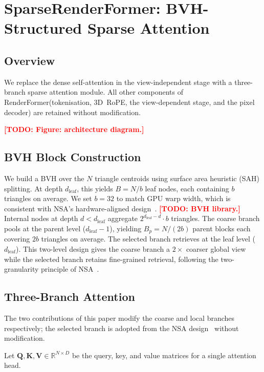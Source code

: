 \documentclass{egpubl}
\newcommand{\ours}{SparseRenderFormer\xspace}
\newcommand{\RF}{RenderFormer\xspace}
\newcommand{\todo}[1]{\textcolor{red}{\textbf{[TODO: #1]}}}
\begin{document}
\section{\ours: BVH-Structured Sparse Attention}
\label{sec:method}

\subsection{Overview}

We replace the dense self-attention in the view-independent stage with a
three-branch sparse attention module.
All other components of \RF (tokenisation, 3D~RoPE, the view-dependent
stage, and the pixel decoder) are retained without modification.

\todo{Figure: architecture diagram.}

\subsection{BVH Block Construction}
\label{sec:bvh}

We build a BVH over the $N$ triangle centroids using surface area heuristic
(SAH) splitting.
At depth $d_\text{leaf}$, this yields $B = N / b$ leaf nodes, each
containing $b$ triangles on average.
We set $b = 32$ to match GPU warp width, which is consistent with
NSA's hardware-aligned design~\cite{yuan2025nsa}.
\todo{BVH library.}
Internal nodes at depth $d < d_\text{leaf}$ aggregate
$2^{d_\text{leaf} - d} \cdot b$ triangles.
The coarse branch pools at the parent level ($d_\text{leaf} - 1$), yielding
$B_p = N / (2b)$ parent blocks each covering $2b$ triangles on average.
The selected branch retrieves at the leaf level ($d_\text{leaf}$).
This two-level design gives the coarse branch a $2\times$ coarser global
view while the selected branch retains fine-grained retrieval, following
the two-granularity principle of NSA~\cite{yuan2025nsa}.

\subsection{Three-Branch Attention}
\label{sec:threebranch}

The two contributions of this paper modify the coarse and local branches
respectively; the selected branch is adopted from the NSA
design~\cite{yuan2025nsa} without modification.

Let $\mathbf{Q}, \mathbf{K}, \mathbf{V} \in \mathbb{R}^{N \times D}$ be
the query, key, and value matrices for a single attention head.
\end{document}
